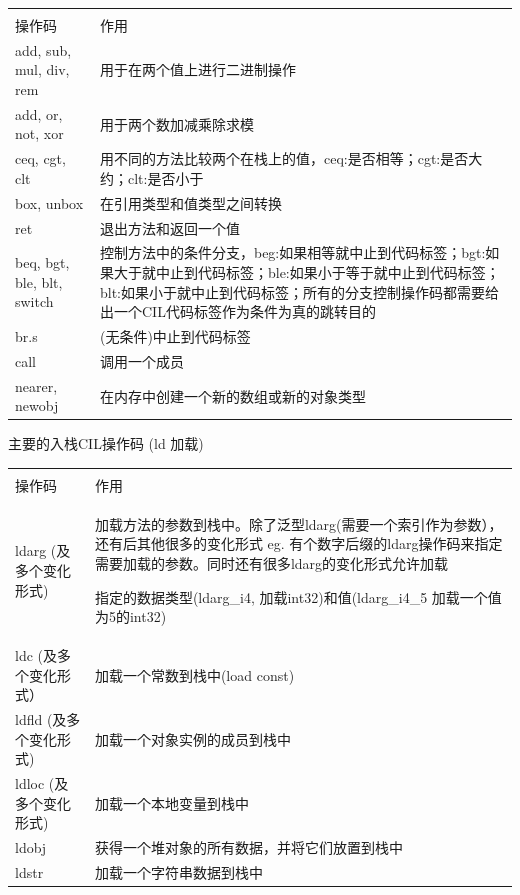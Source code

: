 \documentclass{book}
\begin{document}
\begin{tabular}{l|p{10cm}}
	\multirow{1}{*}{}			
	& \multicolumn{1}{c}{}\\
	操作码 & 作用\\
	\hline
	add, sub, mul, div, rem & 用于在两个值上进行二进制操作\\
	\hline
	add, or, not, xor & 用于两个数加减乘除求模\\
	\hline
	ceq, cgt, clt  & 用不同的方法比较两个在栈上的值，ceq:是否相等；cgt:是否大约；clt:是否小于\\
	\hline
	box, unbox & 在引用类型和值类型之间转换\\
	\hline
	ret & 退出方法和返回一个值\\
	\hline
	beq, bgt, ble, blt, switch & 控制方法中的条件分支，beg:如果相等就中止到代码标签；bgt:如果大于就中止到代码标签；ble:如果小于等于就中止到代码标签；blt:如果小于就中止到代码标签；所有的分支控制操作码都需要给出一个CIL代码标签作为条件为真的跳转目的\\
	\hline
	br.s & (无条件)中止到代码标签\\
	\hline
	call & 调用一个成员\\
	\hline
	nearer, newobj & 在内存中创建一个新的数组或新的对象类型\\
	\hline
\end{tabular} 

主要的入栈CIL操作码  (ld 加载)

\begin{tabular}{l|p{10cm}}
	\multirow{1}{*}{}			
	& \multicolumn{1}{c}{}\\
	操作码 & 作用\\
	\hline
	ldarg (及多个变化形式) & 加载方法的参数到栈中。除了泛型ldarg(需要一个索引作为参数），还有后其他很多的变化形式 eg. 有个数字后缀的ldarg操作码来指定需要加载的参数。同时还有很多ldarg的变化形式允许加载
	
	指定的数据类型(ldarg\_i4, 加载int32)和值(ldarg\_i4\_5 加载一个值为5的int32)\\
	\hline	
	ldc (及多个变化形式） & 加载一个常数到栈中(load const)\\
	\hline
	ldfld (及多个变化形式) & 加载一个对象实例的成员到栈中\\
	\hline
	ldloc (及多个变化形式) & 加载一个本地变量到栈中\\
	\hline
	ldobj & 获得一个堆对象的所有数据，并将它们放置到栈中\\
	\hline
	ldstr & 加载一个字符串数据到栈中\\
\end{tabular}
\end{document}
